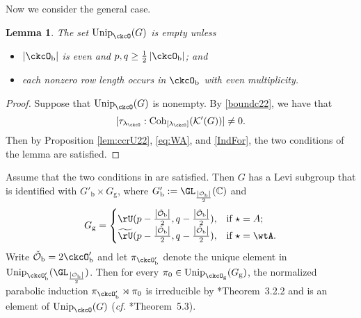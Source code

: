 \documentclass[12pt,a4paper]{amsart}
\newcommand{\trivial}[2][]{\if\relax\detokenize{#1}\relax
  {%
      \color{orange} \vspace{0em} $[$  #2 $]$
      \color{black}
  }
  \else
\ifx#1h
\ifcsname showtrivial\endcsname
{%
    \color{orange} \vspace{0em}  $[$ #2 $]$
    \color{black}
}
\fi
\else {\red Wrong argument!} \fi
\fi
}
\def\abs#1{\left|{#1}\right|}
\newcommand{\CK}{{\mathcal {K}}}
\newcommand{\CO}{{\mathcal {O}}}
\newcommand{\oU}{\operatorname{U}}
\numberwithin{equation}{section}
\newtheorem{lem}[thm]{Lemma}
\theoremstyle{remark}
\def\half{{\tfrac{1}{2}}}
\def\cf{\emph{cf.} }
\def\Unip{\mathrm{Unip}}
\def\lamck{\lambda_\ckcO}
\def\Cint#1{\Coh_{[#1]}}
\def\LC{{}^{\scriptscriptstyle L}\sC}
\def\nbb{n_{\mathrm b}}
\def\tU{\widetilde{\rU}}
\def\Coh{\mathrm{Coh}}
\def\ckcOb{\ckcO_{\mathrm b}}
\def\ckcOpb{\ckcO'_{\mathrm b}}
\def\Gg{G_{\mathrm g}}
\newcommand{\Lam}{{[\lambda]}}
\begin{document}




Now we consider the general case.

\begin{lem} \label{propu0}
The set $\Unip_{\ckcO}(G)$ is empty  unless           \begin{itemize}
            \item $\abs{\ckcOb} $ is even and $p,q \geq \half\abs{\ckcOb}$; and
            \item each nonzero row length occurs in $\ckcOb$ with even multiplicity.
          \end{itemize}
\end{lem}

\begin{proof}
  Suppose that  $\Unip_{\ckcO}(G)$ is nonempty. By \eqref{boundc22}, we have that
  \[
  [\tau_{\lamck}:\Cint{\lamck}(\CK'(G))]\ne 0.
  \]
  Then  by Proposition \ref{lem:ccrU22}, \eqref{eq:WA}, and \eqref{IndFor}, the two conditions of the lemma are satisfied.
  \end{proof}

Assume that the two conditions in  are satisfied. Then $G$ has a Levi subgroup that is identified with $G'_{\mathrm b}\times G_{\mathrm g}$, where
$G'_{\mathrm b}:=\GL_{\frac{\abs{\check \CO_{\mathrm b}}}{2}}(\C)$ and
\[
  G_{\mathrm g} =
  \begin{cases}
    \rU(p-\frac{\abs{\check \CO_{\mathrm b}}}{2},q-\frac{\abs{\check \CO_{\mathrm b}}}{2}),  & \text{if }\star = A;\\
    \tU(p-\frac{\abs{\check \CO_{\mathrm b}}}{2},q-\frac{\abs{\check \CO_{\mathrm b}}}{2}),  & \text{if }\star = \wtA.
\end{cases}
\]
Write $\check \CO_{\mathrm b}=2 \ckcOpb$ and let $\pi_{\ckcOpb}$ denote the
unique element in $\Unip_{\ckcOpb}(\GL_{\frac{\abs{\check \CO_{\mathrm b}}}{2}})$. Then for
every $\pi_0\in \Unip_{\ckcO_{\mathrm g}}(\Gg)$, the normalized parabolic
induction $\pi_{\ckcOpb}\rtimes \pi_{0}$ is irreducible by
\cite{Mat96}*{Theorem~3.2.2} and is an element of $\Unip_{\ckcO}(G)$ (\cf
\cite{MR.U}*{Theorem~5.3}).
\end{document}
